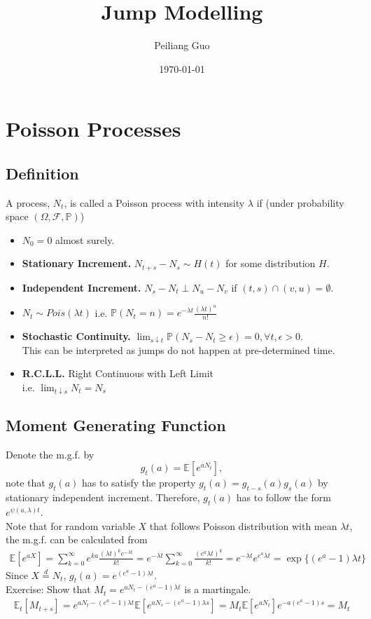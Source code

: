 \documentclass[a4paper]{article}
\title{Jump Modelling}
\author{Peiliang Guo}
\date{\today}
\begin{document}
\maketitle

\section{Poisson Processes}
\subsection{Definition}
A process, $N_t$, is called a Poisson process with intensity $\lambda$ if (under probability space $(\Omega,\mathcal{F},\mathbb{P})$)
\begin{itemize}
	\item $N_0 = 0$ almost surely.
	\item \textbf{Stationary Increment.} $N_{t+s} - N_s \sim H(t)$ for some distribution $H$.
	\item \textbf{Independent Increment.} $N_s-N_t \perp N_u-N_v$ if $(t,s)\cap(v,u)=\emptyset$.
	\item $N_t \sim Pois(\lambda t)$ 
		i.e. $\mathbb{P}(N_t = n) = e^{-\lambda t}\frac{(\lambda t)^n}{n!}$
	\item \textbf{Stochastic Continuity.} $\lim_{s\downarrow t} \mathbb{P}(N_s-N_t\ge \epsilon) = 0, \forall t,\epsilon>0$. \\
		This can be interpreted as jumps do not happen at pre-determined time.
	\item \textbf{R.C.L.L.} Right Continuous with Left Limit\\
	i.e.  $\lim_{t\downarrow s} N_t = N_s$
\end{itemize}
\subsection{Moment Generating Function}
Denote the m.g.f. by $$g_t(a) = \mathbb{E}[e^{aN_t}],$$ note that $g_t(a)$ has to satisfy the property $g_t(a) = g_{t-s}(a) g_s(a)$ by stationary independent increment. Therefore, $g_t(a)$ has to follow the form $e^{\psi(a,\lambda)t}$.\\
Note that for random variable $X$ that follows Poisson distribution with mean $\lambda t$, the m.g.f. can be calculated from 
\begin{align*}
\mathbb{E}[e^{aX}] = \sum_{k=0}^\infty e^{ka}\frac{(\lambda t)^ke^{-\lambda t}}{k!}=e^{-\lambda t}\sum_{k=0}^\infty \frac{(e^a\lambda t)^k}{k!} = e^{-\lambda t}e^{e^a\lambda t} = \exp\{(e^a-1)\lambda t\}
\end{align*}
Since $X \overset{d}{=} N_t$, $g_t(a) = e^{(e^a-1)\lambda t}$.\\
Exercise: Show that $M_t = e^{aN_t-(e^a-1)\lambda t}$ is a martingale.
\begin{align*}
\mathbb{E}_t[M_{t+s}] = e^{aN_t-(e^a-1)\lambda t}\mathbb{E}[e^{aN_{s}-(e^a-1)\lambda s}]=M_t\mathbb{E}[e^{aN_t}]e^{-a(e^a-1)s}=M_t
\end{align*}
\end{document}

